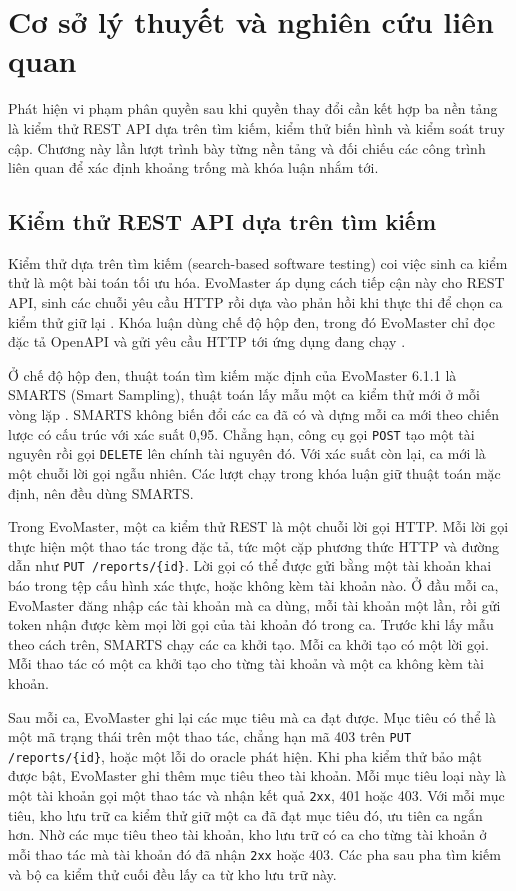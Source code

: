 \chapter{Cơ sở lý thuyết và nghiên cứu liên quan}
\label{chap:background}

Phát hiện vi phạm phân quyền sau khi quyền thay đổi cần kết hợp ba nền tảng là kiểm thử REST API dựa trên tìm kiếm, kiểm thử biến hình và kiểm soát truy cập. Chương này lần lượt trình bày từng nền tảng và đối chiếu các công trình liên quan để xác định khoảng trống mà khóa luận nhắm tới.

\section{Kiểm thử REST API dựa trên tìm kiếm}
\label{sec:bg_sbst}

Kiểm thử dựa trên tìm kiếm (search-based software testing) coi việc sinh ca kiểm thử là một bài toán tối ưu hóa. EvoMaster áp dụng cách tiếp cận này cho REST API, sinh các chuỗi yêu cầu HTTP rồi dựa vào phản hồi khi thực thi để chọn ca kiểm thử giữ lại \cite{arcuri2019evomaster}. Khóa luận dùng chế độ hộp đen, trong đó EvoMaster chỉ đọc đặc tả OpenAPI và gửi yêu cầu HTTP tới ứng dụng đang chạy \cite{arcuri2024evomastertool}.

Ở chế độ hộp đen, thuật toán tìm kiếm mặc định của EvoMaster 6.1.1 là SMARTS (Smart Sampling), thuật toán lấy mẫu một ca kiểm thử mới ở mỗi vòng lặp \cite{evomaster611}. SMARTS không biến đổi các ca đã có và dựng mỗi ca mới theo chiến lược có cấu trúc với xác suất 0,95. Chẳng hạn, công cụ gọi \texttt{POST} tạo một tài nguyên rồi gọi \texttt{DELETE} lên chính tài nguyên đó. Với xác suất còn lại, ca mới là một chuỗi lời gọi ngẫu nhiên. Các lượt chạy trong khóa luận giữ thuật toán mặc định, nên đều dùng SMARTS.

Trong EvoMaster, một ca kiểm thử REST là một chuỗi lời gọi HTTP. Mỗi lời gọi thực hiện một thao tác trong đặc tả, tức một cặp phương thức HTTP và đường dẫn như \texttt{PUT /reports/\{id\}}. Lời gọi có thể được gửi bằng một tài khoản khai báo trong tệp cấu hình xác thực, hoặc không kèm tài khoản nào. Ở đầu mỗi ca, EvoMaster đăng nhập các tài khoản mà ca dùng, mỗi tài khoản một lần, rồi gửi token nhận được kèm mọi lời gọi của tài khoản đó trong ca. Trước khi lấy mẫu theo cách trên, SMARTS chạy các ca khởi tạo. Mỗi ca khởi tạo có một lời gọi. Mỗi thao tác có một ca khởi tạo cho từng tài khoản và một ca không kèm tài khoản.

Sau mỗi ca, EvoMaster ghi lại các mục tiêu mà ca đạt được. Mục tiêu có thể là một mã trạng thái trên một thao tác, chẳng hạn mã 403 trên \texttt{PUT /reports/\{id\}}, hoặc một lỗi do oracle phát hiện. Khi pha kiểm thử bảo mật được bật, EvoMaster ghi thêm mục tiêu theo tài khoản. Mỗi mục tiêu loại này là một tài khoản gọi một thao tác và nhận kết quả \texttt{2xx}, 401 hoặc 403. Với mỗi mục tiêu, kho lưu trữ ca kiểm thử giữ một ca đã đạt mục tiêu đó, ưu tiên ca ngắn hơn. Nhờ các mục tiêu theo tài khoản, kho lưu trữ có ca cho từng tài khoản ở mỗi thao tác mà tài khoản đó đã nhận \texttt{2xx} hoặc 403. Các pha sau pha tìm kiếm và bộ ca kiểm thử cuối đều lấy ca từ kho lưu trữ này.

